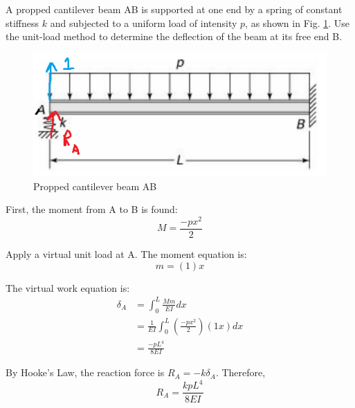 \section{}
A propped cantilever beam AB is supported at one end by a spring of constant stiffness $k$ and subjected to a
uniform load of intensity $p$, as shown in Fig. \ref{fig:Q1ProblemDiagram}. Use the unit-load method to determine the
deflection of the beam at its free end B.

\begin{figure}[h]
    \centering
    \includegraphics[width=0.5\linewidth]{Questions/Figures/Q1ProblemDiagram.png}
    \caption{Propped cantilever beam AB}
    \label{fig:Q1ProblemDiagram}
\end{figure}

First, the moment from A to B is found:
\begin{equation*}
    M = \frac{-px^2}{2} 
\end{equation*}

Apply a virtual unit load at A. The moment equation is:
\begin{equation*}
    m = (1)x
\end{equation*}

The virtual work equation is:
\begin{align*}
    \delta_{A} &= \int_{0}^{L} \frac{Mm}{EI} dx \\
    &= \frac{1}{EI} \int_{0}^{L} \left(\frac{-px^2}{2}\right)(1x) dx \\
    &= \frac{-pL^4}{8EI}
\end{align*}

By Hooke's Law, the reaction force is $R_A = -k\delta_A$. Therefore,
\begin{equation*}
    \boxed{R_A = \frac{kpL^4}{8EI}}
\end{equation*}